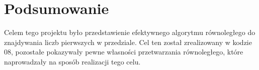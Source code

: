 \documentclass[12pt]{article}
\begin{document}
\section{Podsumowanie}
	Celem tego projektu było przedstawienie efektywnego algorytmu równoległego do znajdywania liczb pierwszych w przedziale. Cel ten został zrealizowany w kodzie 08, pozostałe pokazywały pewne własności przetwarzania równoległego, które naprowadzały na sposób realizacji tego celu.
\end{document}
